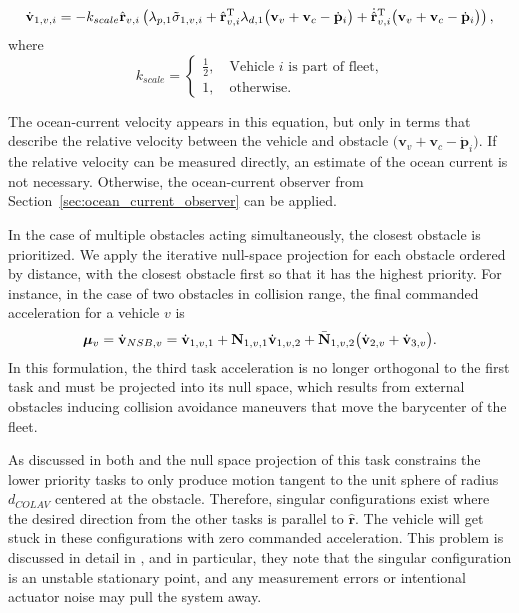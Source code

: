 \begin{equation}\label{eq:high:priority_colav_controller}
    \dot{\mathbf{v}}_{1,v,i} =     -k_{scale}\hat{\mathbf{r}}_{v,i}\left( \lambda_{p,1} \Tilde{\sigma}_{1,v,i} + \hat{\mathbf{r}}_{v,i}^{\rm T}\lambda_{d,1}\bigl(\mathbf{v}_v + \mathbf{v}_c - \dot{\mathbf{p}}_i\bigr) + \dot{\hat{\mathbf{r}}}_{v,i}^{\rm T} \bigl(\mathbf{v}_v+\mathbf{v}_c - \dot{\mathbf{p}}_i\bigr)\right),
\end{equation}
where
\begin{equation}
    k_{scale} = \begin{cases}
    \frac{1}{2}, \quad \text{Vehicle $i$ is part of fleet,}\\
    1, \quad \text{otherwise.}
    \end{cases}
\end{equation}

The ocean-current velocity appears in this equation, but only in terms that describe the relative velocity between the vehicle and obstacle $\bigl(\mathbf{v}_v+\mathbf{v}_c - \dot{\mathbf{p}}_i\bigr)$. If the relative velocity can be measured directly, an estimate of the ocean current is not necessary. Otherwise, the ocean-current observer from Section~\ref{sec:ocean_current_observer} can be applied.


In the case of multiple obstacles acting simultaneously, the closest obstacle is prioritized. We apply the iterative null-space projection for each obstacle ordered by distance, with the closest obstacle first so that it has the highest priority. For instance, in the case of two obstacles in collision range, the final commanded acceleration for a vehicle $v$ is
\begin{equation}
    \bm{\mu}_v = \dot{\mathbf{v}}_{NSB,v} = \dot{\mathbf{v}}_{1,v,1} + \mathbf{N}_{1,v,1}\dot{\mathbf{v}}_{1,v, 2} + \Bar{\mathbf{N}}_{1,v,2} \bigl(\dot{\mathbf{v}}_{2,v} + \dot{\mathbf{v}}_{3,v}\bigr).
\end{equation}
In this formulation, the third task acceleration is no longer orthogonal to the first task and must be projected into its null space, which results from external obstacles inducing collision avoidance maneuvers that move the barycenter of the fleet.

As discussed in both \cite{arrichiello_formation_2006} and \cite{antonelli_kinematic_2006} the null space projection of this task constrains the lower priority tasks to only produce motion tangent to the unit sphere of radius $d_{COLAV}$ centered at the obstacle. Therefore, singular configurations exist where the desired direction from the other tasks is parallel to $\hat{\mathbf{r}}$. The vehicle will get stuck in these configurations with zero commanded acceleration. This problem is discussed in detail in \cite{antonelli_kinematic_2006}, and in particular, they note that the singular configuration is an unstable stationary point, and any measurement errors or intentional actuator noise may pull the system away.

